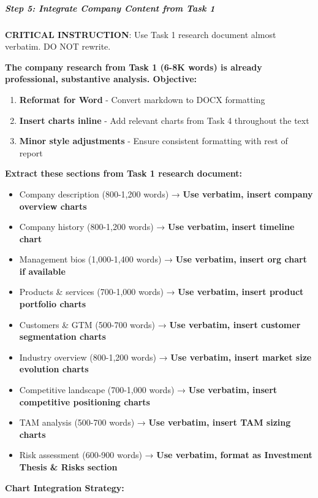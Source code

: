 \documentclass[11pt]{article}
\begin{document}
\subparagraph{Step 5: Integrate Company Content from Task 1}\mbox{}\par

\textbf{CRITICAL INSTRUCTION}: Use Task 1 research document almost verbatim. DO NOT rewrite.


\textbf{The company research from Task 1 (6-8K words) is already professional, substantive analysis. Objective:}

\begin{enumerate}[leftmargin=*,itemsep=2pt,topsep=2pt]
\item {} \textbf{Reformat for Word} - Convert markdown to DOCX formatting
\item {} \textbf{Insert charts inline} - Add relevant charts from Task 4 throughout the text
\item {} \textbf{Minor style adjustments} - Ensure consistent formatting with rest of report
\end{enumerate}

\textbf{Extract these sections from Task 1 research document:}

\begin{itemize}[leftmargin=*,itemsep=2pt,topsep=2pt]
\item {} Company description (800-1,200 words) → \textbf{Use verbatim, insert company overview charts}
\item {} Company history (800-1,200 words) → \textbf{Use verbatim, insert timeline chart}
\item {} Management bios (1,000-1,400 words) → \textbf{Use verbatim, insert org chart if available}
\item {} Products \& services (700-1,000 words) → \textbf{Use verbatim, insert product portfolio charts}
\item {} Customers \& GTM (500-700 words) → \textbf{Use verbatim, insert customer segmentation charts}
\item {} Industry overview (800-1,200 words) → \textbf{Use verbatim, insert market size evolution charts}
\item {} Competitive landscape (700-1,000 words) → \textbf{Use verbatim, insert competitive positioning charts}
\item {} TAM analysis (500-700 words) → \textbf{Use verbatim, insert TAM sizing charts}
\item {} Risk assessment (600-900 words) → \textbf{Use verbatim, format as Investment Thesis \& Risks section}
\end{itemize}

\textbf{Chart Integration Strategy:}
\end{document}
